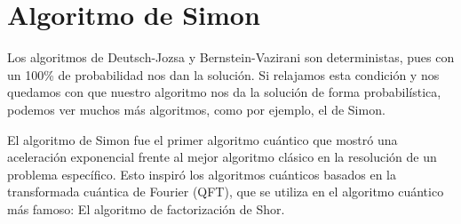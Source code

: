 \documentclass[a4paper,11pt]{book} %
\numberwithin{equation}{chapter}
\begin{document}
	\section{Algoritmo de Simon}

Los algoritmos de Deutsch-Jozsa y Bernstein-Vazirani son deterministas, pues con un 100\% de probabilidad nos dan la solución. Si relajamos esta condición y nos quedamos con que nuestro algoritmo nos da la solución de forma probabilística, podemos ver muchos más algoritmos, como por ejemplo, el de Simon.

El algoritmo de Simon fue el primer algoritmo cuántico que mostró una aceleración exponencial frente al mejor algoritmo clásico en la resolución de un problema específico. Esto inspiró los algoritmos cuánticos basados en la transformada cuántica de Fourier (QFT), que se utiliza en el algoritmo cuántico más famoso: El algoritmo de factorización de Shor.
\end{document}

